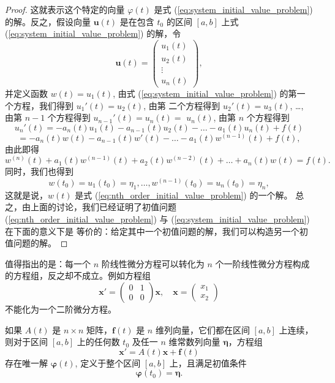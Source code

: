 \begin{proof}
这就表示这个特定的向量 $\varphi(t)$ 是式 (\ref{eq:system_initial_value_problem}) 的解。反之，假设向量 $\mathbf{u}(t)$ 是在包含 $t_0$ 的区间
$[a,b]$ 上式 (\ref{eq:system_initial_value_problem}) 的解，令
$$\mathbf{u}(t) = \begin{pmatrix}
u_1(t) \\ u_2(t) \\ \vdots \\ u_n(t)
\end{pmatrix},$$
并定义函数 $w(t)=u_1(t)$, 由式 (\ref{eq:system_initial_value_problem}) 的第一个方程，我们得到 $u_1'(t)=u_2(t)$, 由第
二个方程得到 $u_2'(t)=u_3(t)$, \dots, 由第 $n-1$ 个方程得到 $u_{n-1}'(t)=u_n(t)=$
$u_n(t)$, 由第 $n$ 个方程得到
$$u_n'(t)=-a_n(t)u_1(t)-a_{n-1}(t)u_2(t)-\dots-a_1(t)u_n(t)+f(t)$$
$$=-a_n(t)w(t)-a_{n-1}(t)w'(t)-\dots-a_1(t)w^{(n-1)}(t)+f(t),$$
由此即得
$$w^{(n)}(t)+a_1(t)w^{(n-1)}(t)+a_2(t)w^{(n-2)}(t)+\dots+a_n(t)w(t)=f(t).$$
同时，我们也得到
$$w(t_0)=u_1(t_0)=\eta_1, \dots, w^{(n-1)}(t_0)=u_n(t_0)=\eta_n,$$
这就是说，$w(t)$ 是式 (\ref{eq:nth_order_initial_value_problem}) 的一个解。
总之，由上面的讨论，我们已经证明了初值问题 (\ref{eq:nth_order_initial_value_problem}) 与 (\ref{eq:system_initial_value_problem}) 在下面的意义下是
等价的：给定其中一个初值问题的解，我们可以构造另一个初值问题的解。
\end{proof}

\begin{remark}
    值得指出的是：每一个 $n$ 阶线性微分方程可以转化为 $n$ 个一阶线性微分方程构成的方程组，反之却不成立。例如方程组
$$\mathbf{x}' = \begin{pmatrix} 0 & 1 \\ 0 & 0 \end{pmatrix}\mathbf{x}, \quad \mathbf{x} = \begin{pmatrix} x_1 \\ x_2 \end{pmatrix}$$
不能化为一个二阶微分方程。
\end{remark}

\begin{theorem}[存在唯一性定理]\label{thm:existence_uniqueness_for_system}
如果 $A(t)$ 是 $n \times n$ 矩阵，$\mathbf{f}(t)$ 是 $n$ 维列向量，它们都在区间 $[a,
b]$ 上连续，则对于区间 $[a,b]$ 上的任何数 $t_0$ 及任一 $n$ 维常数列向量 $\boldsymbol{\eta}$，方程组
\begin{equation}
\mathbf{x}'=A(t)\mathbf{x}+\mathbf{f}(t) \label{eq:matrix_form_DE_system_theorem}
\end{equation}
存在唯一解 $\boldsymbol{\varphi}(t)$, 定义于整个区间 $[a,b]$ 上，且满足初值条件
$$\boldsymbol{\varphi}(t_0)=\boldsymbol{\eta}.$$
\end{theorem}

